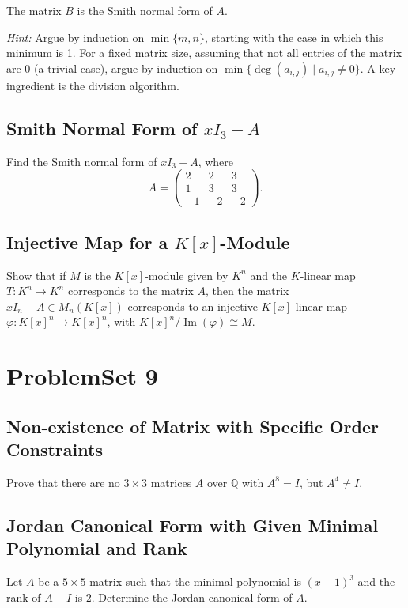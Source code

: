\documentclass[lang=cn,11pt]{template}
\begin{document}
The matrix \( B \) is the Smith normal form of \( A \).

\textit{Hint:} Argue by induction on \( \min\{m, n\} \), starting with the case in which this minimum is 1. For a fixed matrix size, assuming that not all entries of the matrix are 0 (a trivial case), argue by induction on \( \min\{\deg(a_{i,j}) \mid a_{i,j} \neq 0\} \). A key ingredient is the division algorithm.

\section{Smith Normal Form of \( xI_3 - A \)}
Find the Smith normal form of \( xI_3 - A \), where
\[
A = \begin{pmatrix} 2 & 2 & 3 \\ 1 & 3 & 3 \\ -1 & -2 & -2 \end{pmatrix}.
\]

\section{Injective Map for a \( K[x] \)-Module}
Show that if \( M \) is the \( K[x] \)-module given by \( K^n \) and the \( K \)-linear map \( T : K^n \rightarrow K^n \) corresponds to the matrix \( A \), then the matrix \( xI_n - A \in M_n(K[x]) \) corresponds to an injective \( K[x] \)-linear map \( \varphi : K[x]^n \rightarrow K[x]^n \), with \( K[x]^n / \operatorname{Im}(\varphi) \cong M \).










\chapter{ProblemSet 9}

\section{Non-existence of Matrix with Specific Order Constraints}
Prove that there are no \( 3 \times 3 \) matrices \( A \) over \( \mathbb{Q} \) with \( A^8 = I \), but \( A^4 \neq I \).

\section{Jordan Canonical Form with Given Minimal Polynomial and Rank}
Let \( A \) be a \( 5 \times 5 \) matrix such that the minimal polynomial is \( (x - 1)^3 \) and the rank of \( A - I \) is 2. Determine the Jordan canonical form of \( A \).
\end{document}

